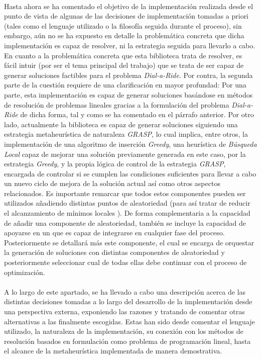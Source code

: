\documentclass{subfiles}
\begin{document}
        \paragraph{}
        Hasta ahora se ha comentado el objetivo de la implementación realizada desde el punto de vista de algunas de las decisiones de implementación tomadas a priori (tales como el lenguaje utilizado o la filosofía seguida durante el proceso), sin embargo, aún no se ha expuesto en detalle la problemática concreta que dicha implementación es capaz de resolver, ni la estrategia seguida para llevarlo a cabo. En cuanto a la problemática concreta que esta biblioteca trata de resolver, es fácil intuir (por ser el tema principal del trabajo) que se trata de ser capaz de generar soluciones factibles para el problema \emph{Dial-a-Ride}. Por contra, la segunda parte de la cuestión requiere de una clarificación en mayor profundad: Por una parte, esta implementación es capaz de generar soluciones basándose en métodos de resolución de problemas lineales gracias a la formulación del problema \emph{Dial-a-Ride} de dicha forma, tal y como se ha comentado en el párrafo anterior. Por otro lado, actualmente la biblioteca es capaz de generar soluciones siguiendo una estrategia metaheurística de naturaleza \emph{GRASP}, lo cual implica, entre otros, la implementación de una algoritmo de inserción \emph{Greedy}, una heurística de \emph{Búsqueda Local} capaz de mejorar una solución previamente generada en este caso, por la estrategia \emph{Greedy}, y la propia lógica de control de la estrategia \emph{GRASP}, encargada de controlar si se cumplen las condiciones suficientes para llevar a cabo un nuevo ciclo de mejora de la solución actual así como otros aspectos relacionados. Es importante remarcar que todos estos componentes pueden ser utilizados añadiendo distintas puntos de aleatoriedad (para así tratar de reducir el alcanzamiento de mínimos locales ). De forma complementaria a la capacidad de añadir una componente de aleatoriedad, también se incluye la capacidad de apoyarse en un  que es capaz de integrarse en cualquier fase del proceso. Posteriormente se detallará más este componente, el cual se encarga de orquestar la generación de soluciones con distintas componentes de aleatoriedad y posteriormente seleccionar cual de todas ellas debe continuar con el proceso de optimización.

        \paragraph{}
        A lo largo de este apartado, se ha llevado a cabo una descripción acerca de las distintas decisiones tomadas a lo largo del desarrollo de la implementación desde una perspectiva externa, exponiendo las razones y tratando de comentar otras alternativas a las finalmente escogidas. Estas han sido desde comentar el lenguaje utilizado, la naturaleza de la implementación, su conexión con los métodos de resolución basados en formulación como problema de programación lineal, hasta el alcance de la metaheurística implementada de manera demostrativa.
\end{document}
